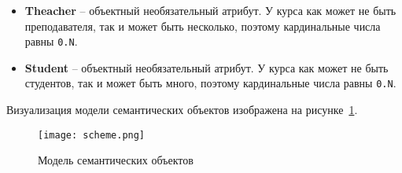 \documentclass[a4paper, 14pt]{extarticle}
\begin{document}
\begin{enumerate}
\begin{itemize}
\begin{itemize}
            \item \texttt{grade} – простой обязательный атрибут. После проведения экзамена обязательно должна быть оценка, поэтому кардинальные числа равны \texttt{1.1}.
            \item \textbf{Teacher} – объектный обязательный атрибут. Преподаватель должен принимать экзамен, для его проведения, поэтому кардинальные числа равны \texttt{1.1}.
        \end{itemize}
        \item \textbf{Theacher} – объектный необязательный атрибут. У курса как может не быть преподавателя, так и может быть несколько, поэтому кардинальные числа равны \texttt{0.N}.
        \item \textbf{Student} – объектный необязательный атрибут. У курса как может не быть студентов, так и может быть много, поэтому кардинальные числа равны \texttt{0.N}.
    \end{itemize}
\end{enumerate}

Визуализация модели семантических объектов изображена на рисунке~\ref{fig:scheme}.

\begin{figure}[!htb]
	\centering
	\texttt{[image: scheme.png]}
\caption{Модель семантических объектов}
\label{fig:scheme}

\end{figure}
\end{document}
